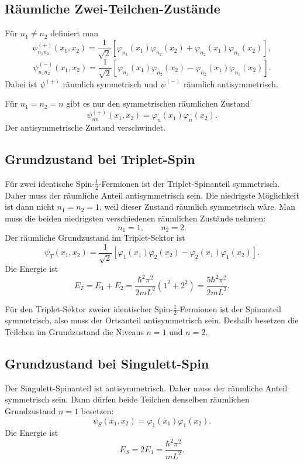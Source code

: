 \subsection{Räumliche Zwei-Teilchen-Zustände}

Für \(n_1\neq n_2\) definiert man
\[
    \psi^{(+)}_{n_1n_2}(x_1,x_2)
    =\frac{1}{\sqrt2}
    \left[\varphi_{n_1}(x_1)\varphi_{n_2}(x_2)
    +\varphi_{n_2}(x_1)\varphi_{n_1}(x_2)\right],
\]
\[
    \psi^{(-)}_{n_1n_2}(x_1,x_2)
    =\frac{1}{\sqrt2}
    \left[\varphi_{n_1}(x_1)\varphi_{n_2}(x_2)
    -\varphi_{n_2}(x_1)\varphi_{n_1}(x_2)\right].
\]
Dabei ist \(\psi^{(+)}\) räumlich symmetrisch und \(\psi^{(-)}\) räumlich antisymmetrisch.

Für \(n_1=n_2=n\) gibt es nur den symmetrischen räumlichen Zustand
\[
    \psi^{(+)}_{nn}(x_1,x_2)
    =\varphi_n(x_1)\varphi_n(x_2).
\]
Der antisymmetrische Zustand verschwindet.

\subsection{Grundzustand bei Triplet-Spin}

Für zwei identische Spin-\(\frac12\)-Fermionen ist der Triplet-Spinanteil symmetrisch. Daher muss der räumliche Anteil antisymmetrisch sein. Die niedrigste Möglichkeit ist dann nicht \(n_1=n_2=1\), weil dieser Zustand räumlich symmetrisch wäre. Man muss die beiden niedrigsten verschiedenen räumlichen Zustände nehmen:
\[
    n_1=1,
    \qquad
    n_2=2.
\]
Der räumliche Grundzustand im Triplet-Sektor ist
\[
    \psi_T(x_1,x_2)
    =\frac{1}{\sqrt2}
    \left[\varphi_1(x_1)\varphi_2(x_2)-\varphi_2(x_1)\varphi_1(x_2)\right].
\]
Die Energie ist
\[
    E_T=E_1+E_2
    =\frac{\hbar^2\pi^2}{2mL^2}(1^2+2^2)
    =\frac{5\hbar^2\pi^2}{2mL^2}.
\]

\begin{answerbox}
Für den Triplet-Sektor zweier identischer Spin-\(\frac12\)-Fermionen ist der Spinanteil symmetrisch, also muss der Ortsanteil antisymmetrisch sein. Deshalb besetzen die Teilchen im Grundzustand die Niveaus \(n=1\) und \(n=2\).
\end{answerbox}

\subsection{Grundzustand bei Singulett-Spin}

Der Singulett-Spinanteil ist antisymmetrisch. Daher muss der räumliche Anteil symmetrisch sein. Dann dürfen beide Teilchen denselben räumlichen Grundzustand \(n=1\) besetzen:
\[
    \psi_S(x_1,x_2)=\varphi_1(x_1)\varphi_1(x_2).
\]
Die Energie ist
\[
    E_S=2E_1
    =\frac{\hbar^2\pi^2}{mL^2}.
\]

